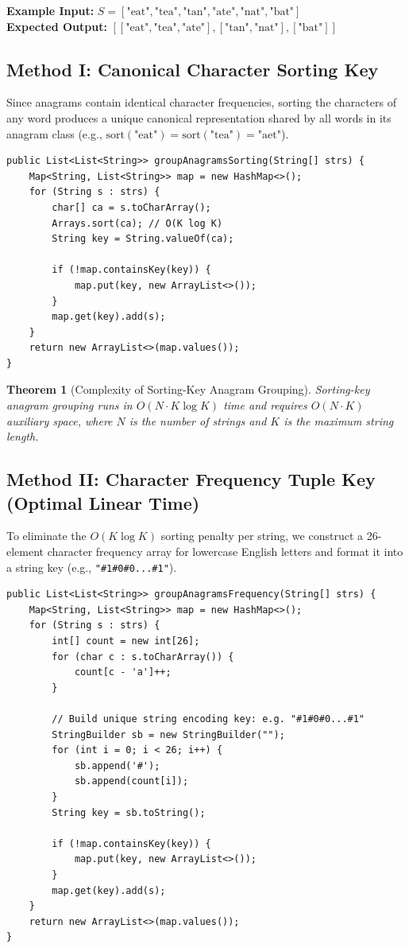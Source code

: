 \documentclass[10pt,journal,compsoc,onecolumn]{IEEEtran}
\newtheorem{theorem}{Theorem}
\begin{document}
\textbf{Example Input:} $S = [\text{"eat"}, \text{"tea"}, \text{"tan"}, \text{"ate"}, \text{"nat"}, \text{"bat"}]$ \\
\textbf{Expected Output:} $[[\text{"eat"}, \text{"tea"}, \text{"ate"}], [\text{"tan"}, \text{"nat"}], [\text{"bat"}]]$

\subsection{Method I: Canonical Character Sorting Key}
Since anagrams contain identical character frequencies, sorting the characters of any word produces a unique canonical representation shared by all words in its anagram class (e.g., $\text{sort}(\text{"eat"}) = \text{sort}(\text{"tea"}) = \text{"aet"}$).

\begin{verbatim}
public List<List<String>> groupAnagramsSorting(String[] strs) {
    Map<String, List<String>> map = new HashMap<>();
    for (String s : strs) {
        char[] ca = s.toCharArray();
        Arrays.sort(ca); // O(K log K)
        String key = String.valueOf(ca);
        
        if (!map.containsKey(key)) {
            map.put(key, new ArrayList<>());
        }
        map.get(key).add(s);
    }
    return new ArrayList<>(map.values());
}
\end{verbatim}

\begin{theorem}[Complexity of Sorting-Key Anagram Grouping]
Sorting-key anagram grouping runs in $O(N \cdot K \log K)$ time and requires $O(N \cdot K)$ auxiliary space, where $N$ is the number of strings and $K$ is the maximum string length.
\end{theorem}

\subsection{Method II: Character Frequency Tuple Key (Optimal Linear Time)}
To eliminate the $O(K \log K)$ sorting penalty per string, we construct a 26-element character frequency array for lowercase English letters and format it into a string key (e.g., \texttt{"\#1\#0\#0...\#1"}).

\begin{verbatim}
public List<List<String>> groupAnagramsFrequency(String[] strs) {
    Map<String, List<String>> map = new HashMap<>();
    for (String s : strs) {
        int[] count = new int[26];
        for (char c : s.toCharArray()) {
            count[c - 'a']++;
        }
        
        // Build unique string encoding key: e.g. "#1#0#0...#1"
        StringBuilder sb = new StringBuilder("");
        for (int i = 0; i < 26; i++) {
            sb.append('#');
            sb.append(count[i]);
        }
        String key = sb.toString();
        
        if (!map.containsKey(key)) {
            map.put(key, new ArrayList<>());
        }
        map.get(key).add(s);
    }
    return new ArrayList<>(map.values());
}
\end{verbatim}
\end{document}
